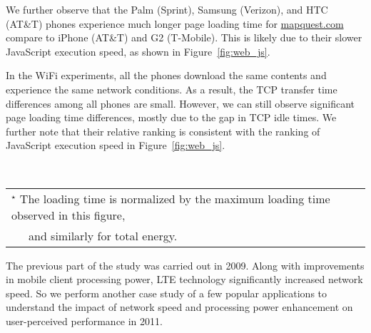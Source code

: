 We further observe that the Palm (Sprint), Samsung (Verizon), and 
HTC (AT\&T) phones experience much longer page loading time for
\url{mapquest.com} compare to iPhone (AT\&T) and G2 (T-Mobile). 
This is likely due to their slower JavaScript execution speed,
as shown in Figure~\ref{fig:web_js}. 


In the WiFi experiments, all the phones download the same contents and 
experience the same network conditions. As a result, the TCP transfer
time differences among all phones are small. However, we can still 
observe significant page loading time differences, mostly due to the
gap in TCP idle times. We further note that their relative ranking is 
consistent with the ranking of JavaScript execution speed in 
Figure~\ref{fig:web_js}.


\begin{figure*}[t]
\centering
{}
\\
\small
\begin{tabular}{l}
$^\star$ The loading time is normalized by the maximum loading time observed in this figure,\\
\ \ \ and similarly for total energy.
\end{tabular}
\label{fig:app.compare}
\end{figure*}

The previous part of the study was carried out in 2009. Along with improvements in mobile client processing power, LTE technology significantly increased network speed. So we perform another case study of a few popular applications to understand the impact of network speed and processing power enhancement on user-perceived performance in 2011.

